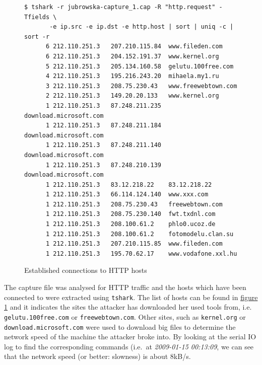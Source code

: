\documentclass[a4paper,
    11pt,
    normalheadings,
    parindent,
    UKenglish,
    abstracton,
    ]{scrartcl}
\begin{document}
\begin{figure}
\begin{verbatim}
$ tshark -r jubrowska-capture_1.cap -R "http.request" -Tfields \
       -e ip.src -e ip.dst -e http.host | sort | uniq -c | sort -r
      6 212.110.251.3   207.210.115.84  www.fileden.com
      6 212.110.251.3   204.152.191.37  www.kernel.org
      5 212.110.251.3   205.134.160.58  gelutu.100free.com
      4 212.110.251.3   195.216.243.20  mihaela.my1.ru
      3 212.110.251.3   208.75.230.43   www.freewebtown.com
      2 212.110.251.3   149.20.20.133   www.kernel.org
      1 212.110.251.3   87.248.211.235  download.microsoft.com
      1 212.110.251.3   87.248.211.184  download.microsoft.com
      1 212.110.251.3   87.248.211.140  download.microsoft.com
      1 212.110.251.3   87.248.210.139  download.microsoft.com
      1 212.110.251.3   83.12.218.22    83.12.218.22
      1 212.110.251.3   66.114.124.140  www.xxx.com
      1 212.110.251.3   208.75.230.43   freewebtown.com
      1 212.110.251.3   208.75.230.140  fwt.txdnl.com
      1 212.110.251.3   208.100.61.2    phlo0.ucoz.de
      1 212.110.251.3   208.100.61.2    fotomodelu.clan.su
      1 212.110.251.3   207.210.115.85  www.fileden.com
      1 212.110.251.3   195.70.62.17    www.vodafone.xxl.hu
\end{verbatim}
\caption{Established connections to HTTP hosts}
\label{fig:http-hosts}
\end{figure}
The capture file was analysed for HTTP traffic and the hosts which have been connected to were extracted using \texttt{tshark}.
The list of hosts can be found in
\hyperref[fig:http-hosts]{figure \ref*{fig:http-hosts}}
and it indicates the sites the attacker has downloaded her used tools from, i.e. \texttt{gelutu.100free.com} or \texttt{freewebtown.com}.
Other sites, such as \texttt{kernel.org} or \texttt{download.microsoft.com} were used to download big files to determine the network speed of the machine the attacker broke into.
By looking at the serial IO log to find the corresponding commands (i.e.\, at \emph{2009-01-15 00:13:09}, we can see that the network speed (or better: slowness) is about 8kB/s.
\end{document}
